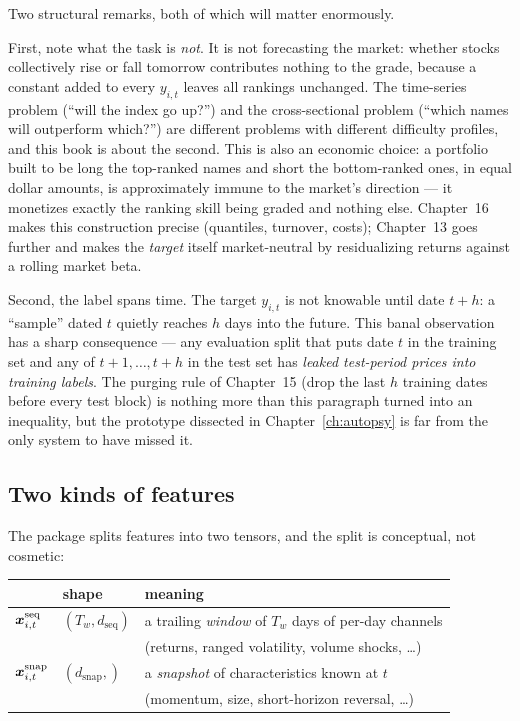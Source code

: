 Two structural remarks, both of which will matter enormously.

First, note what the task is \emph{not}. It is not forecasting the market:
whether stocks collectively rise or fall tomorrow contributes nothing to the
grade, because a constant added to every $y_{i,t}$ leaves all rankings
unchanged. The time-series problem (``will the index go up?'') and the
cross-sectional problem (``which names will outperform which?'') are
different problems with different difficulty profiles, and this book is about
the second. This is also an economic choice: a portfolio built to be long the
top-ranked names and short the bottom-ranked ones, in equal dollar amounts,
is approximately immune to the market's direction --- it monetizes exactly
the ranking skill being graded and nothing else. Chapter~16 makes this
construction precise (quantiles, turnover, costs); Chapter~13 goes further
and makes the \emph{target} itself market-neutral by residualizing returns
against a rolling market beta.

Second, the label spans time. The target $y_{i,t}$ is not knowable until date
$t+h$: a ``sample'' dated $t$ quietly reaches $h$ days into the future. This
banal observation has a sharp consequence --- any evaluation split that puts
date $t$ in the training set and any of $t+1, \dots, t+h$ in the test set has
\emph{leaked test-period prices into training labels}. The purging rule of
Chapter~15 (drop the last $h$ training dates before every test block) is
nothing more than this paragraph turned into an inequality, but the
prototype dissected in Chapter~\ref{ch:autopsy} is far from the only system
to have missed it.

\subsection{Two kinds of features}

The package splits features into two tensors, and the split is conceptual,
not cosmetic:

\begin{center}
\small
\begin{tabular}{@{}lll@{}}
\toprule
 & shape & meaning \\
\midrule
$\bm{x}^{\text{seq}}_{i,t}$ & $(T_w, d_{\text{seq}})$ &
  a trailing \emph{window} of $T_w$ days of per-day channels \\
 & & (returns, ranged volatility, volume shocks, \dots) \\
$\bm{x}^{\text{snap}}_{i,t}$ & $(d_{\text{snap}},)$ &
  a \emph{snapshot} of characteristics known at $t$ \\
 & & (momentum, size, short-horizon reversal, \dots) \\
\bottomrule
\end{tabular}
\end{center}

